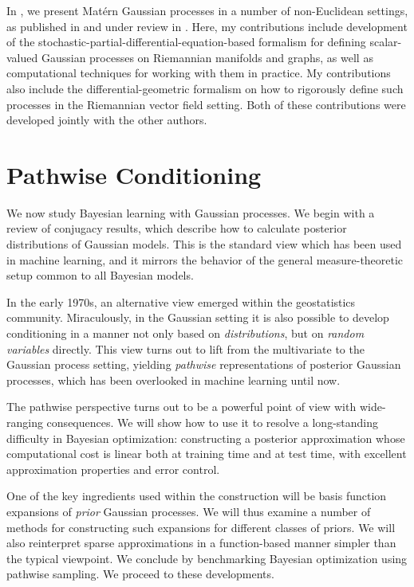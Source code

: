 \documentclass[11pt]{book}
\begin{document}
In , we present Matérn Gaussian processes in a number of non-Euclidean settings, as published in \textcite{borovitskiy20,borovitskiy21} and under review in \textcite{hutchinson21}.
Here, my contributions include development of the stochastic-partial-differential-equation-based formalism for defining scalar-valued Gaussian processes on Riemannian manifolds and graphs, as well as computational techniques for working with them in practice.
My contributions also include the differential-geometric formalism on how to rigorously define such processes in the Riemannian vector field setting.
Both of these contributions were developed jointly with the other authors.


\chapter{Pathwise Conditioning}
\label{ch:pathwise}

We now study Bayesian learning with Gaussian processes.
We begin with a review of conjugacy results, which describe how to calculate posterior distributions of Gaussian models.
This is the standard view which has been used in machine learning, and it mirrors the behavior of the general measure-theoretic setup common to all Bayesian models.

In the early 1970s, an alternative view emerged within the geostatistics community.
Miraculously, in the Gaussian setting it is also possible to develop conditioning in a manner not only based on \emph{distributions}, but on \emph{random variables} directly.
This view turns out to lift from the multivariate to the Gaussian process setting, yielding \emph{pathwise} representations of posterior Gaussian processes, which has been overlooked in machine learning until now.

The pathwise perspective turns out to be a powerful point of view with wide-ranging consequences.
We will show how to use it to resolve a long-standing difficulty in Bayesian optimization: constructing a posterior approximation whose computational cost is linear both at training time and at test time, with excellent approximation properties and error control.

One of the key ingredients used within the construction will be basis function expansions of \emph{prior} Gaussian processes.
We will thus examine a number of methods for constructing such expansions for different classes of priors.
We will also reinterpret sparse approximations in a function-based manner simpler than the typical viewpoint.
We conclude by benchmarking Bayesian optimization using pathwise sampling.
We proceed to these developments.
\end{document}
